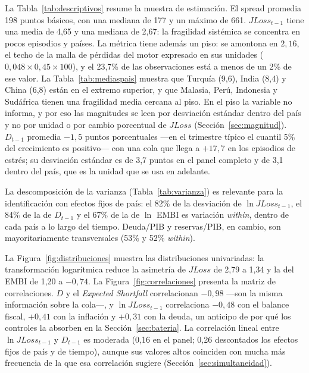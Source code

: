 La Tabla~\ref{tab:descriptivos} resume la muestra de estimación. El spread promedia 198 puntos básicos, con una mediana de 177 y un máximo de 661. $JLoss_{t-1}$ tiene una media de 4,65 y una mediana de 2,67: la fragilidad sistémica se concentra en pocos episodios y países. La métrica tiene además un piso: se amontona en $2{,}16$, el techo de la malla de pérdidas del motor expresado en sus unidades ($0{,}048\times0{,}45\times100$), y el 23,7\% de las observaciones está a menos de un 2\% de ese valor. La Tabla~\ref{tab:mediaspais} muestra que Turquía (9,6), India (8,4) y China (6,8) están en el extremo superior, y que Malasia, Perú, Indonesia y Sudáfrica tienen una fragilidad media cercana al piso. En el piso la variable no informa, y por eso las magnitudes se leen por desviación estándar dentro del país y no por unidad o por cambio porcentual de $JLoss$ (Sección~\ref{sec:magnitud}). $D_{t-1}$ promedia $-1{,}5$ puntos porcentuales ---en el trimestre típico el cuantil 5\% del crecimiento es positivo--- con una cola que llega a $+17{,}7$ en los episodios de estrés; su desviación estándar es de 3,7 puntos en el panel completo y de 3,1 dentro del país, que es la unidad que se usa en adelante.

La descomposición de la varianza (Tabla~\ref{tab:varianza}) es relevante para la identificación con efectos fijos de país: el 82\% de la desviación de $\ln JLoss_{t-1}$, el 84\% de la de $D_{t-1}$ y el 67\% de la de $\ln$ EMBI es variación \textit{within}, dentro de cada país a lo largo del tiempo. Deuda/PIB y reservas/PIB, en cambio, son mayoritariamente transversales (53\% y 52\% \textit{within}).



La Figura~\ref{fig:distribuciones} muestra las distribuciones univariadas: la transformación logarítmica reduce la asimetría de $JLoss$ de 2,79 a 1,34 y la del EMBI de 1,20 a $-0{,}74$. La Figura~\ref{fig:correlaciones} presenta la matriz de correlaciones. $D$ y el \textit{Expected Shortfall} correlacionan $-0{,}98$ ---son la misma información sobre la cola---, y $\ln JLoss_{t-1}$ correlaciona $-0{,}48$ con el balance fiscal, $+0{,}41$ con la inflación y $+0{,}31$ con la deuda, un anticipo de por qué los controles la absorben en la Sección~\ref{sec:bateria}. La correlación lineal entre $\ln JLoss_{t-1}$ y $D_{t-1}$ es moderada (0,16 en el panel; 0,26 descontados los efectos fijos de país y de tiempo), aunque sus valores altos coinciden con mucha más frecuencia de la que esa correlación sugiere (Sección~\ref{sec:simultaneidad}).

